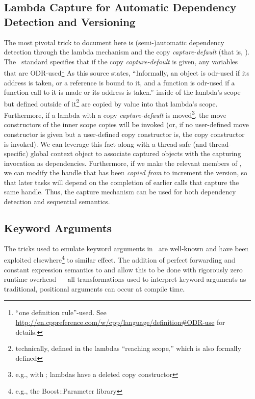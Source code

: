 \subsection{Lambda Capture for Automatic Dependency Detection and Versioning}

The most pivotal trick to document here is (semi-)automatic dependency detection
through the  lambda mechanism and the copy {\it capture-default} (that is,
\inlinecode{[=]}).  The \CC\ standard specifies that if the copy
{\it capture-default} is given, any variables that are ODR-used\footnote{``one
definition rule''-used.  See
\url{http://en.cppreference.com/w/cpp/language/definition\#ODR-use} for
details.} 
As this source states, ``Informally, an object is odr-used if its address is
taken, or a reference is bound to it, and a function is odr-used if a function
call to it is made or its address is taken.'' inside of the lambda's scope but
defined outside of it\footnote{technically, defined in the lambdas
``reaching scope,'' which is also formally defined} are copied by value into
that lambda's scope.  Furthermore, if a lambda with a copy {\it capture-default}
is moved\footnote{e.g., with ; lambdas have a deleted
copy constructor}, the move constructors of the inner scope copies will be
invoked (or, if no user-defined move constructor is given but a user-defined
copy constructor is, the copy constructor is invoked).  We can leverage this
fact along with a thread-safe (and thread-specific) global context object to
associate captured  objects with the capturing
 invocation as dependencies.  Furthermore, if we
make the relevant members of  ,
we can modify the handle that has been {\it copied from} to increment the
version, so that later tasks will depend on the completion of earlier
 calls that capture the same handle.  Thus, the capture
mechanism can be used for both dependency detection and sequential semantics.

\subsection{Keyword Arguments}
\label{sec:kwargs}

The tricks used to emulate keyword arguments in \CC\ are well-known and have been
exploited elsewhere\footnote{e.g., the Boost::Parameter library} to similar
effect.  The addition of perfect forwarding and constant expression semantics to
 and  allow this to be done with rigorously zero runtime overhead ---
all transformations used to interpret keyword arguments as traditional,
positional arguments can occur at compile time.
